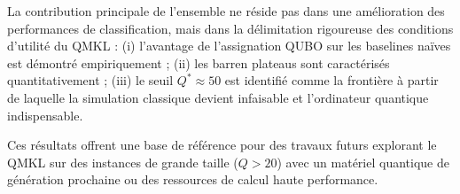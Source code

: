 \documentclass[12pt,a4paper]{article}
\begin{document}
La contribution principale de l'ensemble ne réside pas dans une amélioration
des performances de classification, mais dans la délimitation rigoureuse des
conditions d'utilité du QMKL :
(i) l'avantage de l'assignation QUBO sur les baselines naïves est démontré
    empiriquement ;
(ii) les barren plateaus sont caractérisés quantitativement ;
(iii) le seuil $Q^* \approx 50$ est identifié comme la frontière à partir
     de laquelle la simulation classique devient infaisable et l'ordinateur
     quantique indispensable.

Ces résultats offrent une base de référence pour des travaux futurs explorant
le QMKL sur des instances de grande taille ($Q > 20$) avec un matériel
quantique de génération prochaine ou des ressources de calcul haute
performance.

\end{document}

